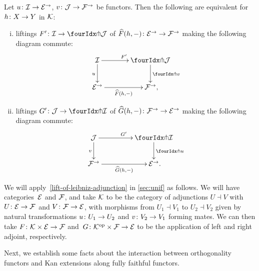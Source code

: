 \documentclass[reqno,10pt,a4paper,oneside,draft]{amsart}
\begin{document}
{{\begin{proposition} \label{lift-of-leibniz-adjunction}
Let $u \co \cal{I} \to \catE^\to$, $v \co \cal{J} \to \cal{F}^\to$ be functors.
Then the following are equivalent for $h \co X \to Y$ in $\cal{K}$:
\begin{enumerate}[(i)]
\item liftings $F' \co \cal{I} \to \liftl{\cal{J}}$ of $\widehat{F}(h, \arghole) \co \catE^\to \to \cal{F}^\to$ making the following diagram commute:
\[
\xymatrix@C=1.2cm{
  \cal{I}
  \ar[r]^{F'}
  \ar[d]_{u}
&
  \liftl{\cal{J}}
  \ar[d]^{\liftl{v}}
\\
  \catE^\to
  \ar[r]_-{\widehat{F}(h, \arghole)}
&
  \cal{F}^\to
\rlap{,}}
\]
\item liftings $G' \co \cal{J} \to \liftr{\cal{I}}$ of $\widehat{G}(h, \arghole) \co \cal{F}^\to \to \catE^\to$ making the following diagram commute:
\[
\xymatrix@C+2em{
  \cal{J}
  \ar[d]_{v}
  \ar[r]^{G'}
&
  \liftr{\cal{I}}
  \ar[d]^{\liftr{u}}
\\
  \cal{F}^\to
  \ar[r]_-{\widehat{G}(h, \arghole)}
&
  \catE^\to
\rlap{.}}
\]
\end{enumerate}
\end{proposition}




\begin{remark} \label{pitchfork-leibniz-most-general-example} We will apply~\cref{lift-of-leibniz-adjunction} in \cref{sec:unif}
as follows. We will have categories~$\cal{E}$ and $\cal{F}$, and take $\cal{K}$ to be the category of adjunctions 
$U \dashv V$ with $U \co \catE \to \cal{F}$ and $V \co \cal{F} \to \catE$, with morphisms from $U_1 \dashv V_1$ to $U_2 \dashv V_2$ 
given by natural transformations $u \co U_1 \to U_2$ and $v \co V_2 \to V_1$ forming mates. We can then take 
$F \co \cal{K} \times \catE \to \cal{F}$ and~$G \co \cal{K}^{\op} \times \cal{F} \to \catE$ to be the 
application of left and right adjoint, respectively.
 \end{remark}


Next, we establish some facts about the interaction between orthogonality functors and Kan extensions along fully faithful functors. 

}}
\end{document}
